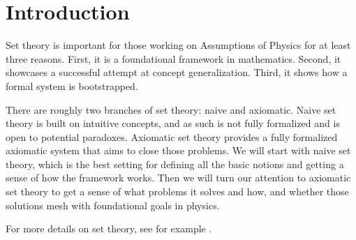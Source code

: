 \documentclass{bareminimum}
\author{Gabriele Carcassi}
\begin{document}
\maketitle
	
\section{Introduction}

Set theory is important for those working on Assumptions of Physics for at least three reasons. First, it is a foundational framework in mathematics. Second, it showcases a successful attempt at concept generalization. Third, it shows how a formal system is bootstrapped.

There are roughly two branches of set theory: naive and axiomatic. Naive set theory is built on intuitive concepts, and as such is not fully formalized and is open to potential paradoxes. Axiomatic set theory provides a fully formalized axiomatic system that aims to close those problems. We will start with naive set theory, which is the best setting for defining all the basic notions and getting a sense of how the framework works. Then we will turn our attention to axiomatic set theory to get a sense of what problems it solves and how, and whether those solutions mesh with foundational goals in physics.

For more details on set theory, see for example \cite{pinter2014book}.
\end{document}
